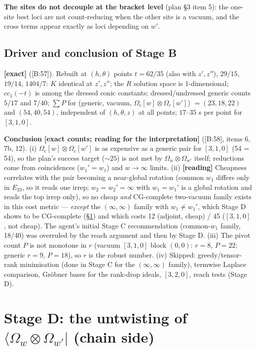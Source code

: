 \documentclass[10pt]{article}
\newcommand{\cl}[2]{\textsf{[#1:#2]}}
\newcommand{\tg}[1]{\textbf{[#1]}}
\newcommand{\Om}{\Omega}
\newcommand{\bra}[1]{\langle #1|}
\begin{document}
\textbf{The sites do not decouple at the bracket level} (plan \S3 item 5): the one-site best loci are not count-reducing when the other site is a vacuum, and the cross terms appear exactly as loci depending on $w'$.

\subsection{Driver and conclusion of Stage B}\label{sec:Bdriver}

\tg{exact} (\cl{B}{57}). Rebuilt at $(h,\theta)$ points $t=62/35$ (also with $z',z''$), $29/15$, $19/14$, $1404/7$: $K$ identical at $z',z''$; the $R$ solution space is 1-dimensional; $cc_1(-t)$ is among the dressed conic constants; dressed/undressed generic counts $5/17$ and $7/40$; $\sum P$ for (generic, vacuum, $\Om_c[w]\otimes\Om_c[w']$) $=(23,18,22)$ and $(54,40,54)$, independent of $(h,\theta,z)$ at all points; $17$--$35$ s per point for $[3,1,0]$.

\textbf{Conclusion} \tg{exact counts; reading for the interpretation} (\cl{B}{58}, items 6, 7b, 12). (i) $\Om_c[w]\otimes\Om_c[w']$ is as expensive as a generic pair for $[3,1,0]$ (54 = 54), so the plan's success target ($\sim25$) is not met by $\Om_w\otimes\Om_{w'}$ itself; reductions come from coincidences ($w_1'=w_1$) and $w\to\infty$ limits. (ii) \tg{reading} Cheapness correlates with the pair becoming a near-global rotation (common $w_1$ differs only in $E_{23}$, so it reads one irrep; $w_2=w_2'=\infty$ with $w_1=w_1'$ is a global rotation and reads the top irrep only), so no cheap \emph{and} CG-complete two-vacuum family exists in this cost metric --- \emph{except} the $(\infty,\infty)$ family with $w_1\neq w_1'$, which Stage D shows to be CG-complete (\S\ref{sec:D}) and which costs 12 (adjoint, cheap) / 45 ($[3,1,0]$, not cheap). The agent's initial Stage C recommendation (common-$w_1$ family, 18/40) was overruled by the reach argument and then by Stage D. (iii) The pivot count $P$ is not monotone in $r$ (vacuum $[3,1,0]$ block $(0,\allowbreak 0)$: $r=8$, $P=22$; generic $r=9$, $P=18$), so $r$ is the robust number. (iv) Skipped: greedy/tensor-rank minimisation (done in Stage C for the $(\infty,\infty)$ family), termwise Laplace comparison, Gr\"obner bases for the rank-drop ideals, $[3,2,0]$, reach tests (Stage D).

\section{Stage D: the untwisting of $\bra{\Om_w\otimes\Om_{w'}}$ (chain side)}\label{sec:D}
\end{document}
